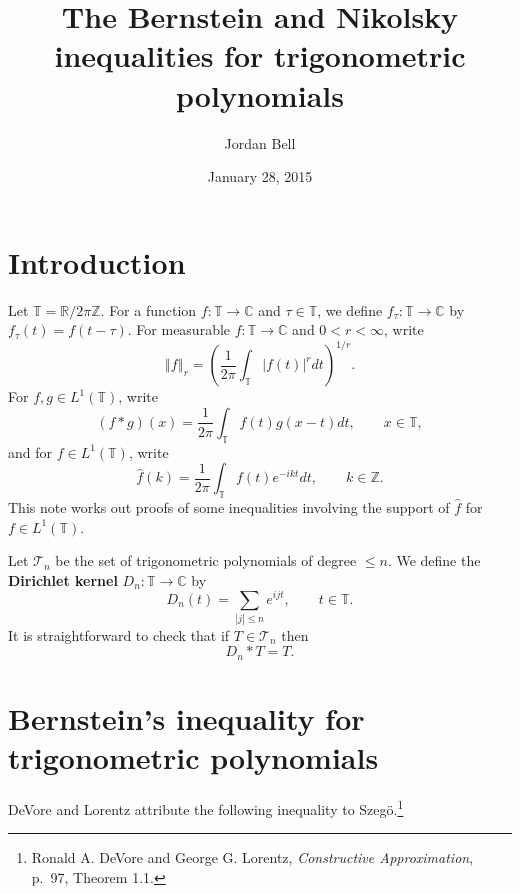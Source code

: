 \documentclass{article}
\newcommand{\norm}[1]{\left\Vert #1 \right\Vert}
\theoremstyle{definition}
\begin{document}
\title{The Bernstein and Nikolsky inequalities for trigonometric polynomials}
\author{Jordan Bell}
\date{January 28, 2015}

\maketitle

\section{Introduction}
Let $\mathbb{T}=\mathbb{R}/2\pi \mathbb{Z}$. For a function $f:\mathbb{T} \to \mathbb{C}$ and $\tau \in \mathbb{T}$, we define
$f_\tau:\mathbb{T} \to \mathbb{C}$ by $f_\tau(t)=f(t-\tau)$.
For measurable $f:\mathbb{T} \to \mathbb{C}$ and $0<r<\infty$, write
\[
\norm{f}_r = \left(\frac{1}{2\pi} \int_{\mathbb{T}} |f(t)|^r dt\right)^{1/r}.
\]
For $f,g \in L^1(\mathbb{T})$, write
\[
(f*g)(x) = \frac{1}{2\pi} \int_{\mathbb{T}} f(t)g(x-t) dt, \qquad x \in \mathbb{T},
\]
and for $f \in L^1(\mathbb{T})$, write
\[
\hat{f}(k)=\frac{1}{2\pi} \int_{\mathbb{T}} f(t) e^{-ikt} dt, \qquad k \in \mathbb{Z}.
\]
This note works out proofs of some inequalities involving the support of  $\hat{f}$ for
$f \in L^1(\mathbb{T})$.



Let $\mathscr{T}_n$ be the set of trigonometric polynomials of degree $\leq n$. 
We define the \textbf{Dirichlet kernel} $D_n:\mathbb{T} \to \mathbb{C}$ by
\[
D_n(t) = \sum_{|j| \leq n} e^{ijt}, \qquad t \in \mathbb{T}.
\]
It is straightforward to check that if $T \in \mathscr{T}_n$ then 
\[
D_n * T = T.
\]



\section{Bernstein's inequality for trigonometric polynomials}
DeVore and Lorentz attribute the following inequality to Szeg\"o.\footnote{Ronald A. DeVore and George G. Lorentz,
{\em Constructive Approximation}, p.~97, Theorem 1.1.}
\end{document}
